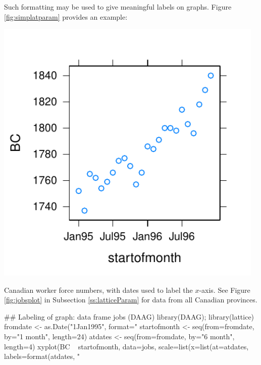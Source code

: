 \documentclass{tufte-book}\usepackage[]{graphicx}\usepackage[]{color}
\begin{document}
Such formatting may be used to give meaningful labels on graphs.
Figure \ref{fig:simplatparam} provides an example:
\begin{marginfigure}[2cm]
\begin{Schunk}


\centerline{\includegraphics[width=0.97\textwidth]{figs/04-date-labs-1} }

\end{Schunk}
 \caption{Canadian worker force numbers, with dates used to label the
   $x$-axis. See Figure \ref{fig:jobsplot} in
   Subsection \ref{ss:latticeParam} for data from all Canadian
 provinces.}\label{fig:simplatparam}
\end{marginfigure}
\begin{Schunk}
\begin{Sinput}
## Labeling of graph: data frame jobs (DAAG)
library(DAAG); library(lattice)
fromdate <- as.Date("1Jan1995", format="%
startofmonth <- seq(from=fromdate, by="1 month",
                    length=24)
atdates <- seq(from=fromdate, by="6 month",
               length=4)
xyplot(BC ~ startofmonth, data=jobs,
       scale=list(x=list(at=atdates,
                         labels=format(atdates,
                                       "%
\end{Sinput}
\end{Schunk}
\end{document}
